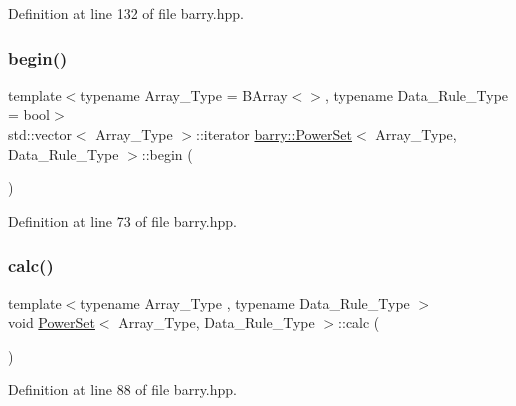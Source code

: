 Definition at line 132 of file barry.\+hpp.

\mbox{\label{classbarry_1_1_power_set_a0db34800ac228a47917cc9f3e08a88a9}} 
\subsubsection{\texorpdfstring{begin()}{begin()}}
{\footnotesize\ttfamily template$<$typename Array\+\_\+\+Type  = B\+Array$<$$>$, typename Data\+\_\+\+Rule\+\_\+\+Type  = bool$>$ \\
std\+::vector$<$ Array\+\_\+\+Type $>$\+::iterator \hyperlink{classbarry_1_1_power_set}{barry\+::\+Power\+Set}$<$ Array\+\_\+\+Type, Data\+\_\+\+Rule\+\_\+\+Type $>$\+::begin (\begin{DoxyParamCaption}{ }\end{DoxyParamCaption})\hspace{0.3cm}{\ttfamily [inline]}}



Definition at line 73 of file barry.\+hpp.

\mbox{\label{classbarry_1_1_power_set_ad3b707294498105b2cc1a04017cc96d2}} 
\subsubsection{\texorpdfstring{calc()}{calc()}}
{\footnotesize\ttfamily template$<$typename Array\+\_\+\+Type , typename Data\+\_\+\+Rule\+\_\+\+Type $>$ \\
void \hyperlink{classbarry_1_1_power_set}{Power\+Set}$<$ Array\+\_\+\+Type, Data\+\_\+\+Rule\+\_\+\+Type $>$\+::calc (\begin{DoxyParamCaption}{ }\end{DoxyParamCaption})\hspace{0.3cm}{\ttfamily [inline]}}



Definition at line 88 of file barry.\+hpp.

\mbox{\label{classbarry_1_1_power_set_a1fb01ffc52e39a831058c480e981da9e}} 
